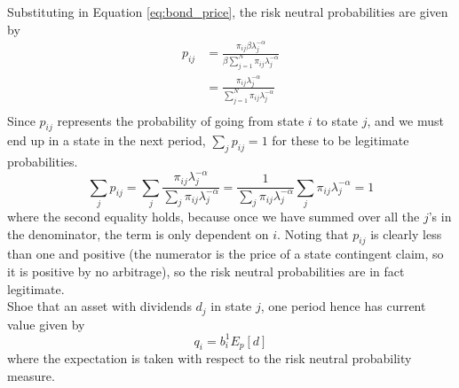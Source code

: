 \documentclass[french]{article}
\begin{document}
\begin{enumerate}[I.]
	Substituting in Equation \ref{eq:bond_price}, the risk neutral probabilities are given by 
	\begin{equation*}
	\begin{split}
		p_{ij} &= \frac{\pi_{ij}\beta \lambda_j^{-\alpha}}{\beta \sum_{j=1}^{N}\pi_{ij}\lambda_j^{-\alpha}}\\
		&=\frac{\pi_{ij} \lambda_j^{-\alpha}}{\sum_{j=1}^{N}\pi_{ij}\lambda_j^{-\alpha}}\\
	\end{split}
	\end{equation*}
	Since $p_{ij}$ represents the probability of going from state $i$ to state $j$, and we must end up in a state in the next period, $\sum_j p_{ij} =1$ for these to be legitimate probabilities. 
	\begin{equation*}
		\sum_j p_{ij} = \sum_j\frac{\pi_{ij} \lambda_j^{-\alpha}}{\sum_{j}\pi_{ij}\lambda_j^{-\alpha}} = \frac{1}{\sum_{j}\pi_{ij}\lambda_j^{-\alpha}}\sum_j \pi_{ij} \lambda_j^{-\alpha} = 1
	\end{equation*}
	where the second equality holds, because once we have summed over all the $j$'s in the denominator, the term is only dependent on $i$. Noting that $p_{ij}$ is clearly less than one and positive (the numerator is the price of a state contingent claim, so it is positive by no arbitrage), so the risk neutral probabilities are in fact legitimate. \\
	
	Shoe that an asset with dividends $d_j$ in state $j$, one period hence has current value given by 
	\begin{equation*}
		q_i = b^1_i E_p\left[d\right]
	\end{equation*}
	where the expectation is taken with respect to the risk neutral probability measure. 
\end{enumerate}

 
\end{document}
